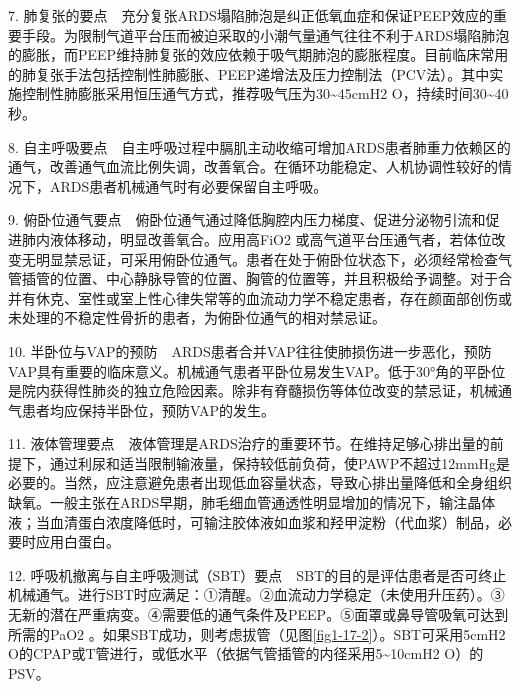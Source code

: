 7.
肺复张的要点　充分复张ARDS塌陷肺泡是纠正低氧血症和保证PEEP效应的重要手段。为限制气道平台压而被迫采取的小潮气量通气往往不利于ARDS塌陷肺泡的膨胀，而PEEP维持肺复张的效应依赖于吸气期肺泡的膨胀程度。目前临床常用的肺复张手法包括控制性肺膨胀、PEEP递增法及压力控制法（PCV法）。其中实施控制性肺膨胀采用恒压通气方式，推荐吸气压为30\textasciitilde{}45cmH{2}
O，持续时间30\textasciitilde{}40秒。

8.
自主呼吸要点　自主呼吸过程中膈肌主动收缩可增加ARDS患者肺重力依赖区的通气，改善通气血流比例失调，改善氧合。在循环功能稳定、人机协调性较好的情况下，ARDS患者机械通气时有必要保留自主呼吸。

9.
俯卧位通气要点　俯卧位通气通过降低胸腔内压力梯度、促进分泌物引流和促进肺内液体移动，明显改善氧合。应用高FiO{2}
或高气道平台压通气者，若体位改变无明显禁忌证，可采用俯卧位通气。患者在处于俯卧位状态下，必须经常检查气管插管的位置、中心静脉导管的位置、胸管的位置等，并且积极给予调整。对于合并有休克、室性或室上性心律失常等的血流动力学不稳定患者，存在颜面部创伤或未处理的不稳定性骨折的患者，为俯卧位通气的相对禁忌证。

10.
半卧位与VAP的预防　ARDS患者合并VAP往往使肺损伤进一步恶化，预防VAP具有重要的临床意义。机械通气患者平卧位易发生VAP。低于30°角的平卧位是院内获得性肺炎的独立危险因素。除非有脊髓损伤等体位改变的禁忌证，机械通气患者均应保持半卧位，预防VAP的发生。

11.
液体管理要点　液体管理是ARDS治疗的重要环节。在维持足够心排出量的前提下，通过利尿和适当限制输液量，保持较低前负荷，使PAWP不超过12mmHg是必要的。当然，应注意避免患者出现低血容量状态，导致心排出量降低和全身组织缺氧。一般主张在ARDS早期，肺毛细血管通透性明显增加的情况下，输注晶体液；当血清蛋白浓度降低时，可输注胶体液如血浆和羟甲淀粉（代血浆）制品，必要时应用白蛋白。

12.
呼吸机撤离与自主呼吸测试（SBT）要点　SBT的目的是评估患者是否可终止机械通气。进行SBT时应满足：①清醒。②血流动力学稳定（未使用升压药）。③无新的潜在严重病变。④需要低的通气条件及PEEP。⑤面罩或鼻导管吸氧可达到所需的PaO{2}
。如果SBT成功，则考虑拔管（见图\ref{fig1-17-2}）。SBT可采用5cmH{2}
O的CPAP或T管进行，或低水平（依据气管插管的内径采用5\textasciitilde{}10cmH{2}
O）的PSV。

